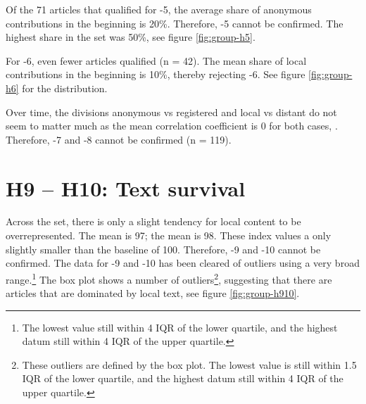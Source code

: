 Of the 71 articles that qualified for \hyp{5}, the average share of anonymous contributions in the beginning is 20\%.
Therefore, \hyp{5} cannot be confirmed.
The highest share in the set was 50\%, see figure \ref{fig:group-h5}.

For \hyp{6}, even fewer articles qualified (n = 42).
The mean share of local contributions in the beginning is 10\%, thereby rejecting \hyp{6}.
See figure \ref{fig:group-h6} for the distribution.


Over time, the divisions anonymous vs registered and local vs distant do not seem to matter much as the mean correlation coefficient is 0 for both cases, .
Therefore, \hyp{7} and \hyp{8} cannot be confirmed (n = 119).



\section{H9 -- H10: Text survival}

Across the set, there is only a slight tendency for local content to be overrepresented. 
The mean  is 97; the mean  is 98.
These index values a only slightly smaller than the baseline of 100.
Therefore, \hyp{9} and \hyp{10} cannot be confirmed.
The data for \hyp{9} and \hyp{10} has been cleared of outliers using a very broad range.\footnote{The lowest value still within 4 \ac{IQR} of the lower quartile, and the highest datum still within 4 \ac{IQR} of the upper quartile.}
The box plot shows a number of outliers\footnote{These outliers are defined by the box plot. The lowest value is still within 1.5 \ac{IQR} of the lower quartile, and the highest datum still within 4 \ac{IQR} of the upper quartile.}, suggesting that there are articles that are dominated by local text, see figure \ref{fig:group-h910}.




